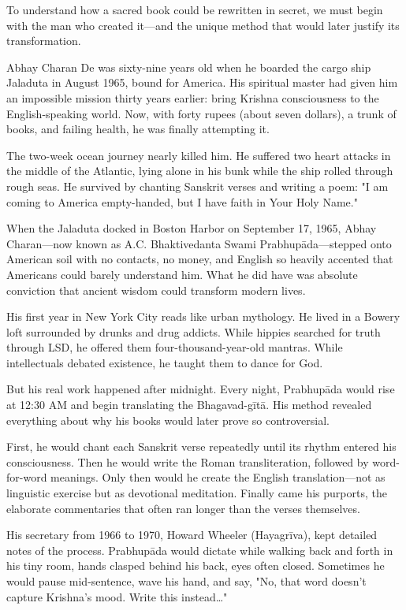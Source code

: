 \documentclass[11pt,twoside]{book}
\begin{document}
\normalfont\justifying
To understand how a sacred book could be rewritten in secret, we must begin with the man who created it—and the unique method that would later justify its transformation.

Abhay Charan De was sixty-nine years old when he boarded the cargo ship Jaladuta in August 1965, bound for America. His spiritual master had given him an impossible mission thirty years earlier: bring Krishna consciousness to the English-speaking world. Now, with forty rupees (about seven dollars), a trunk of books, and failing health, he was finally attempting it.

The two-week ocean journey nearly killed him. He suffered two heart attacks in the middle of the Atlantic, lying alone in his bunk while the ship rolled through rough seas. He survived by chanting Sanskrit verses and writing a poem: "I am coming to America empty-handed, but I have faith in Your Holy Name."

When the Jaladuta docked in Boston Harbor on September 17, 1965, Abhay Charan—now known as A.C. Bhaktivedanta Swami Prabhupāda—stepped onto American soil with no contacts, no money, and English so heavily accented that Americans could barely understand him. What he did have was absolute conviction that ancient wisdom could transform modern lives.

His first year in New York City reads like urban mythology. He lived in a Bowery loft surrounded by drunks and drug addicts. While hippies searched for truth through LSD, he offered them four-thousand-year-old mantras. While intellectuals debated existence, he taught them to dance for God.

But his real work happened after midnight. Every night, Prabhupāda would rise at 12:30 AM and begin translating the Bhagavad-gītā. His method revealed everything about why his books would later prove so controversial.

First, he would chant each Sanskrit verse repeatedly until its rhythm entered his consciousness. Then he would write the Roman transliteration, followed by word-for-word meanings. Only then would he create the English translation—not as linguistic exercise but as devotional meditation. Finally came his purports, the elaborate commentaries that often ran longer than the verses themselves.

His secretary from 1966 to 1970, Howard Wheeler (Hayagrīva), kept detailed notes of the process. Prabhupāda would dictate while walking back and forth in his tiny room, hands clasped behind his back, eyes often closed. Sometimes he would pause mid-sentence, wave his hand, and say, "No, that word doesn't capture Krishna's mood. Write this instead\ldots{}"
\end{document}
